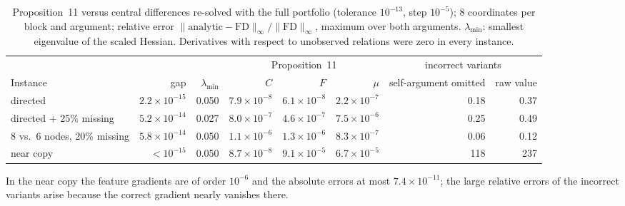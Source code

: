 \documentclass[12pt]{article}
\begin{document}
\begin{table}[h]
\caption{Proposition~11 versus central differences re-solved with the full portfolio (tolerance $10^{-13}$, step $10^{-5}$); 8 coordinates per block and argument; relative error $\|\text{analytic}-\text{FD}\|_\infty/\|\text{FD}\|_\infty$, maximum over both arguments. $\lambda_{\min}$: smallest eigenvalue of the scaled Hessian. Derivatives with respect to unobserved relations were zero in every instance.}\label{tab:sensverif}
\centering\footnotesize
\begin{tabular}{lrrrrrrr}
\toprule
 & & & \multicolumn{3}{c}{Proposition~11} & \multicolumn{2}{c}{incorrect variants}\\
\cmidrule(lr){4-6}\cmidrule(lr){7-8}
Instance & gap & $\lambda_{\min}$ & $C$ & $F$ & $\mu$ & self-argument omitted & raw value\\
\midrule
directed & $2.2\times10^{-15}$ & 0.050 & $7.9\times10^{-8}$ & $6.1\times10^{-8}$ & $2.2\times10^{-7}$ & 0.18 & 0.37\\
directed + 25\% missing & $5.2\times10^{-14}$ & 0.027 & $8.0\times10^{-7}$ & $4.6\times10^{-7}$ & $7.5\times10^{-6}$ & 0.25 & 0.49\\
8 vs.\ 6 nodes, 20\% missing & $5.8\times10^{-14}$ & 0.050 & $1.1\times10^{-6}$ & $1.3\times10^{-6}$ & $8.3\times10^{-7}$ & 0.06 & 0.12\\
near copy & $<10^{-15}$ & 0.050 & $8.7\times10^{-8}$ & $9.1\times10^{-5}$ & $6.7\times10^{-5}$ & 118 & 237\\
\bottomrule
\end{tabular}
\end{table}

In the near copy the feature gradients are of order $10^{-6}$ and the absolute errors at most $7.4\times10^{-11}$; the large relative errors of the incorrect variants arise because the correct gradient nearly vanishes there.
\end{document}

